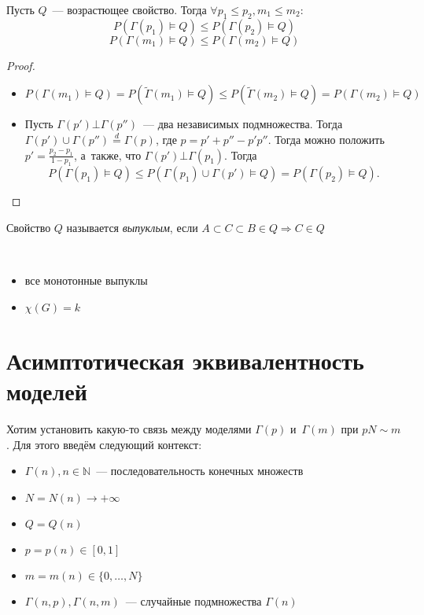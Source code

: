 \documentclass{article}
\begin{document}
\begin{lemma}
	Пусть $Q$~--- возрастющее свойство. Тогда $\forall p_1 \le p_2, m_1 \le m_2$:
	$$ P(\Gamma(p_1) \models Q) \le P(\Gamma(p_2) \models Q) $$
	$$ P(\Gamma(m_1) \models Q) \le P(\Gamma(m_2) \models Q) $$
\end{lemma}
\begin{proof}~\
	\begin{itemize}
		\item $P(\Gamma(m_1) \models Q) = P(\tilde\Gamma(m_1) \models Q) \le
			P(\tilde\Gamma(m_2) \models Q) = P(\Gamma(m_2) \models Q)$
		\item Пусть $\Gamma(p') \bot \Gamma(p'')$~--- два независимых подмножества.
			Тогда $\Gamma(p') \cup \Gamma(p'') \overset{d}= \Gamma(p)$, где $p = p' +
			p'' - p' p''$. Тогда можно положить $p' = \frac{p_2 - p_1}{1 - p_1}$,
			а~также, что $\Gamma(p') \bot \Gamma(p_1)$. Тогда
			$$P(\Gamma(p_1) \models Q) \le P(\Gamma(p_1) \cup \Gamma(p') \models Q) =
			P(\Gamma(p_2) \models Q).$$
	\end{itemize}
\end{proof}

\begin{definition}
	Свойство $Q$ называется \emph{выпуклым}, если $A \subset C \subset B \in Q
	\Rightarrow C \in Q$
\end{definition}

\begin{example}~\
	\begin{itemize}
		\item все монотонные выпуклы
		\item $\chi(G) = k$
	\end{itemize}
\end{example}

\section{Асимптотическая эквивалентность моделей}

Хотим установить какую-то связь между моделями $\Gamma(p)$ и~$\Gamma(m)$ при $pN
\sim m$. Для этого введём следующий контекст:

\begin{itemize}
	\item $\Gamma(n), n \in \mathbb{N}$~--- последовательность конечных множеств
	\item $N = N(n) \rightarrow +\infty$
	\item $Q = Q(n)$
	\item $p = p(n) \in [0, 1]$
	\item $m = m(n) \in \{0, \ldots, N\}$
	\item $\Gamma(n, p), \Gamma(n, m)$~--- случайные подмножества $\Gamma(n)$
\end{itemize}
\end{document}
